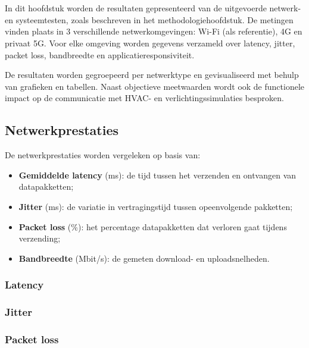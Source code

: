 \chapter{}%
\label{ch:resultaten}


In dit hoofdstuk worden de resultaten gepresenteerd van de uitgevoerde netwerk- en systeemtesten, zoals beschreven in het methodologiehoofdstuk. De metingen vinden plaats in 3 verschillende netwerkomgevingen: Wi-Fi (als referentie), 4G en privaat 5G. Voor elke omgeving worden gegevens verzameld over latency, jitter, packet loss, bandbreedte en applicatieresponsiviteit.

De resultaten worden gegroepeerd per netwerktype en gevisualiseerd met behulp van grafieken en tabellen. Naast objectieve meetwaarden wordt ook de functionele impact op de communicatie met HVAC- en verlichtingssimulaties besproken.

\section{Netwerkprestaties}

De netwerkprestaties worden vergeleken op basis van:

\begin{itemize}
    \item \textbf{Gemiddelde latency} (ms): de tijd tussen het verzenden en ontvangen van datapakketten;
    \item \textbf{Jitter} (ms): de variatie in vertragingstijd tussen opeenvolgende pakketten;
    \item \textbf{Packet loss} (\%): het percentage datapakketten dat verloren gaat tijdens verzending;
    \item \textbf{Bandbreedte} (Mbit/s): de gemeten download- en uploadsnelheden.
\end{itemize}

\subsection{Latency}

\subsection{Jitter}

\subsection{Packet loss}

